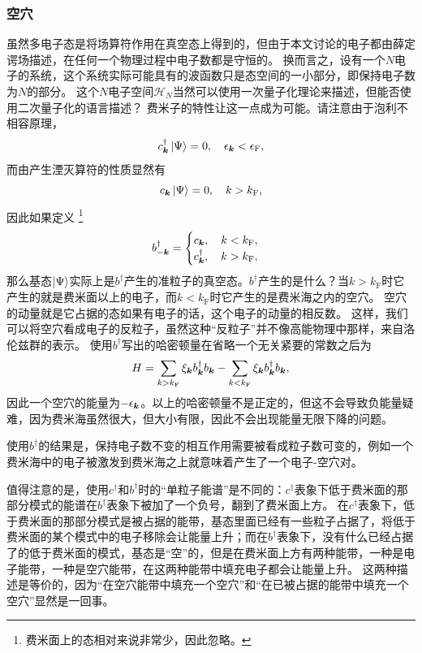 \subsubsection{空穴} 

虽然多电子态是将场算符作用在真空态上得到的，但由于本文讨论的电子都由薛定谔场描述，在任何一个物理过程中电子数都是守恒的。
换而言之，设有一个$N$电子的系统，这个系统实际可能具有的波函数只是态空间的一小部分，即保持电子数为$N$的部分。
这个$N$电子空间$\mathcal{H}_N$当然可以使用一次量子化理论来描述，但能否使用二次量子化的语言描述？
费米子的特性让这一点成为可能。请注意由于泡利不相容原理，
\[
    {c}^\dagger_{\vb*{k}} \ket{\Psi} = 0, \quad \epsilon_{\vb*{k}} < \epsilon_\text{F},
\]
而由产生湮灭算符的性质显然有
\[
    {c}_{\vb*{k}} \ket{\Psi} = 0, \quad k > k_\text{F},
\]
因此如果定义%
\footnote{费米面上的态相对来说非常少，因此忽略。}%
\begin{equation}
    {b}^\dagger_{-\vb*{k}} = \begin{cases}
        {c}_{\vb*{k}}, \quad k < k_\text{F}, \\
        {c}_{\vb*{k}}^\dagger, \quad k > k_\text{F},
    \end{cases}
\end{equation}
那么基态$\ket{\Psi}$实际上是${b}^\dagger$产生的准粒子的真空态。${b}^\dagger$产生的是什么？当$k>k_\text{F}$时它产生的就是费米面以上的电子，而$k<k_\text{F}$时它产生的是费米海之内的空穴。
空穴的动量就是它占据的态如果有电子的话，这个电子的动量的相反数。%
这样，我们可以将空穴看成电子的反粒子，虽然这种“反粒子”并不像高能物理中那样，来自洛伦兹群的表示。
使用${b}^\dagger$写出的哈密顿量在省略一个无关紧要的常数之后为
\[
    {H} = \sum_{k > k_\text{F}} \xi_{\vb*{k}} {b}^\dagger_{\vb*{k}} {b}_{\vb*{k}} - \sum_{k < k_\text{F}} \xi_{\vb*{k}} {b}^\dagger_{\vb*{k}} {b}_{\vb*{k}},
\]
因此一个空穴的能量为$-\epsilon_{\vb*{k}}$。以上的哈密顿量不是正定的，但这不会导致负能量疑难，因为费米海虽然很大，但大小有限，因此不会出现能量无限下降的问题。

使用${b}^\dagger$的结果是，保持电子数不变的相互作用需要被看成粒子数可变的，例如一个费米海中的电子被激发到费米海之上就意味着产生了一个电子-空穴对。

值得注意的是，使用$c^\dagger$和$b^\dagger$时的“单粒子能谱”是不同的：$c^\dagger$表象下低于费米面的那部分模式的能谱在$b^\dagger$表象下被加了一个负号，翻到了费米面上方。
在$c^\dagger$表象下，低于费米面的那部分模式是被占据的能带，基态里面已经有一些粒子占据了，将低于费米面的某个模式中的电子移除会让能量上升；而在$b^\dagger$表象下，没有什么已经占据了的低于费米面的模式，基态是“空”的，但是在费米面上方有两种能带，一种是电子能带，一种是空穴能带，在这两种能带中填充电子都会让能量上升。
这两种描述是等价的，因为“在空穴能带中填充一个空穴”和“在已被占据的能带中填充一个空穴”显然是一回事。

